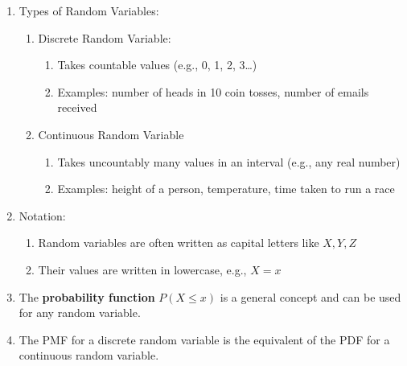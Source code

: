 \begin{enumerate}
    \item Types of Random Variables:
    \hfill \cite{common/online/chatgpt}
    \begin{enumerate}
        \item Discrete Random Variable:
        \hfill \cite{common/online/chatgpt}
        \begin{enumerate}
            \item Takes countable values (e.g., 0, 1, 2, 3…)
            \hfill \cite{common/online/chatgpt}

            \item Examples: number of heads in 10 coin tosses, number of emails received
            \hfill \cite{common/online/chatgpt}
        \end{enumerate}

        \item Continuous Random Variable
        \hfill \cite{common/online/chatgpt}
        \begin{enumerate}
            \item Takes uncountably many values in an interval (e.g., any real number)
            \hfill \cite{common/online/chatgpt}

            \item Examples: height of a person, temperature, time taken to run a race
            \hfill \cite{common/online/chatgpt}
        \end{enumerate}
    \end{enumerate}

    \item Notation:
    \begin{enumerate}
        \item Random variables are often written as capital letters like $X, Y, Z$
        \hfill \cite{common/online/chatgpt}

        \item Their values are written in lowercase, e.g., $X=x$
        \hfill \cite{common/online/chatgpt}
    \end{enumerate}

    \item The \textbf{probability function} $P(X \leq x)$ is a general concept and can be used for any random variable.
    \hfill \cite{statistics/book/Statistics-for-Data-Scientists/Maurits-Kaptein}

    \item The PMF for a discrete random variable is the equivalent of the PDF for a continuous random variable.
    \hfill \cite{statistics/book/Statistics-for-Data-Scientists/Maurits-Kaptein}


\end{enumerate}
